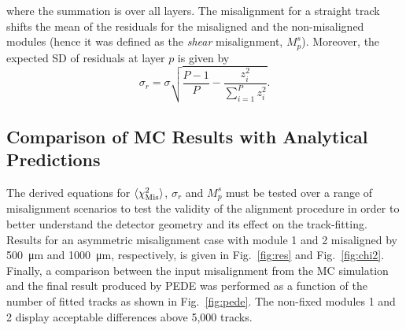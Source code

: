 \documentclass[a4paper,11pt]{article}
\begin{document}
where the summation is over all layers. The misalignment for a straight track shifts the mean of the residuals for the misaligned and the non-misaligned modules (hence it was defined as the \textit{shear} misalignment, $M^{s}_p$). Moreover, the expected SD of residuals at layer $p$ is given by
\begin{equation}
\sigma_r=\sigma\sqrt{\frac{P-1}{P}-\frac{z_i^2}{\sum_{i=1}^{P} z_i^2}}.
\label{eq:res}
\end{equation}

\subsection{Comparison of MC Results with Analytical Predictions}
The derived equations for $\langle \chi^2_{\rm{Mis}} \rangle$, $\sigma_r$ and $M^{s}_p$ must be tested over a range of misalignment scenarios to test the validity of the alignment procedure in order to better understand the detector geometry and its effect on the track-fitting. Results for an asymmetric misalignment case with module 1 and 2 misaligned by \SI{500}{\micro\metre} and \SI{1000}{\micro\metre}, respectively, is given in Fig.~\ref{fig:res} and Fig.~\ref{fig:chi2}. Finally, a comparison between the input misalignment from the MC simulation and the final result produced by PEDE was performed as a function of the number of fitted tracks as shown in Fig.~\ref{fig:pede}. The non-fixed modules 1 and 2 display acceptable differences above 5,000 tracks.
\clearpage
\end{document}
